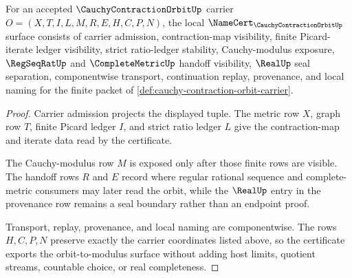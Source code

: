 \begin{theorem}
\label{thm:cauchy-contraction-orbit-namecert-obligations}
For an accepted $\CauchyContractionOrbitUp$ carrier $O=(X,T,I,L,M,R,E,H,C,P,N)$, the local $\NameCert_{\CauchyContractionOrbitUp}$ surface consists of carrier admission, contraction-map visibility, finite Picard-iterate ledger visibility, strict ratio-ledger stability, Cauchy-modulus exposure, $\RegSeqRatUp$ and $\CompleteMetricUp$ handoff visibility, $\RealUp$ seal separation, componentwise transport, continuation replay, provenance, and local naming for the finite packet of \autoref{def:cauchy-contraction-orbit-carrier}.
\end{theorem}
\begin{proof}
Carrier admission projects the displayed tuple. The metric row $X$, graph row $T$, finite Picard ledger $I$, and strict ratio ledger $L$ give the contraction-map and iterate data read by the certificate.

The Cauchy-modulus row $M$ is exposed only after those finite rows are visible. The handoff rows $R$ and $E$ record where regular rational sequence and complete-metric consumers may later read the orbit, while the $\RealUp$ entry in the provenance row remains a seal boundary rather than an endpoint proof.

Transport, replay, provenance, and local naming are componentwise. The rows $H,C,P,N$ preserve exactly the carrier coordinates listed above, so the certificate exports the orbit-to-modulus surface without adding host limits, quotient streams, countable choice, or real completeness.
\end{proof}


